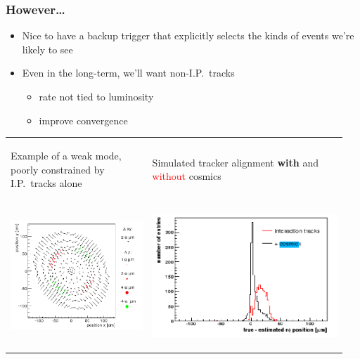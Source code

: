 \documentclass[compress]{beamer}
\begin{document}
\begin{frame}
\frametitle{However\ldots}
\begin{itemize}
\item Nice to have a backup trigger that explicitly selects the kinds of events we're likely to see
\item Even in the long-term, we'll want non-I.P.\ tracks
\begin{itemize}
\item rate not tied to luminosity
\item improve convergence 
\end{itemize}
\end{itemize}

\begin{tabular}{p{0.4\linewidth} p{0.55\linewidth}}
\vspace{-0.5 cm} \begin{center}Example of a weak mode, poorly constrained by I.P.\ tracks alone\end{center} & 
\vspace{-0.5 cm} \begin{center}Simulated tracker alignment {\bf with} and \textcolor{red}{without} cosmics\end{center} \\
\vspace{-1.2 cm} \begin{center}\includegraphics[height=4 cm]{weak_modes.png}\end{center} &
\vspace{-1.2 cm} \begin{center}\includegraphics[height=4 cm]{addition_of_cosmics.png}\end{center} \\
\end{tabular}
\vspace{-0.5 cm}

\end{frame}
\end{document}
